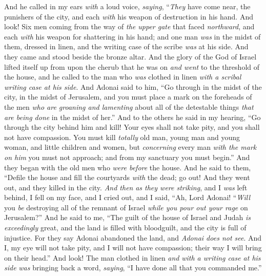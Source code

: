\begin{biblechapter} %
 And he called in my ears \textit{with} a loud voice, \textit{saying}, “\textit{They} have come near, the punishers of the city, and each \textit{with} his weapon of destruction in his hand.
\verse And look! Six men coming from the way of \textit{the upper gate} that faced \textit{northward}, and each \textit{with} his weapon for shattering in his hand; and one man \textit{was} in the midst of them, dressed in linen, and the writing case of the scribe \textit{was} at his side. And they came and stood beside the bronze altar.
\verse And the glory of the God of Israel lifted itself up from upon the cherub that he was on \textit{and went} to the threshold of the house, and he called to the man who \textit{was} clothed in linen \textit{with a scribal writing case at his side}.
\verse And Adonai said to him, “Go through in the midst of the city, in the midst of Jerusalem, and you must place a mark on the foreheads of the men \textit{who are groaning and lamenting} about all of the detestable things \textit{that are being done} in the midst of her.”
\verse And to the others he said in my hearing, “Go through the city behind him and kill! Your eyes shall not take pity, and you shall not have compassion.
\verse You must kill \textit{totally} old man, young man and young woman, and little children and women, but \textit{concerning} every man \textit{with the mark on him} you must not approach; and from my sanctuary you must begin.” And they began with the old men who \textit{were before} the house.
\verse And he said to them, “Defile the house and fill the courtyards \textit{with} the dead; go out! And they went out, and they killed in the city.
\verse \textit{And then} \textit{as they were striking}, and I \textit{was} left behind, I fell on my face, and I cried out, and I said, “Ah, Lord Adonai! “\textit{Will} you \textit{be} destroying all of the remnant of Israel \textit{while you pour out your rage} on Jerusalem?”
\verse And he said to me, “The guilt of the house of Israel and Judah \textit{is} \textit{exceedingly} great, and the land is filled with bloodguilt, and the city is full of injustice. For they say Adonai abandoned the land, and \textit{Adonai does not see}.
\verse And I, my eye will not take pity, and I will not have compassion; their way I will bring on their head.”
\verse And look! The man clothed in linen \textit{and} \textit{with a writing case at his side} \textit{was} bringing back a word, \textit{saying}, “I have done all that you commanded me.”
\end{biblechapter}


